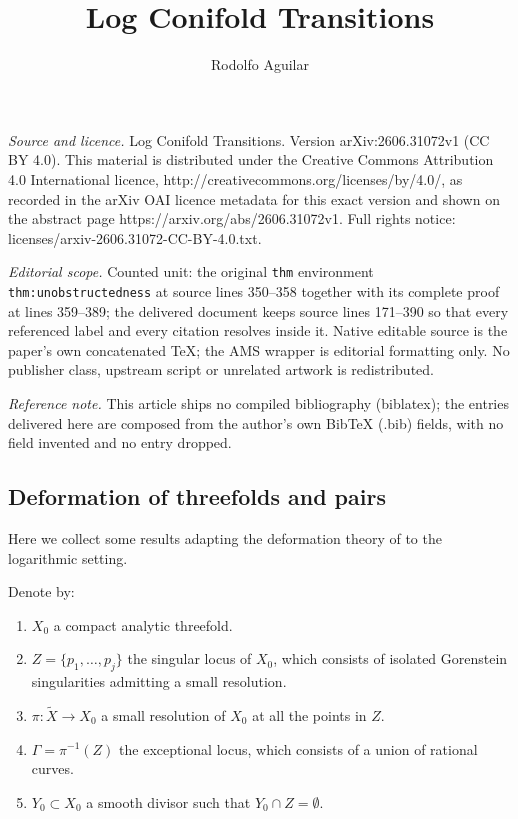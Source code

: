 \documentclass[10pt,a4paper]{amsart}
\begin{document}
\title[Log Conifold Transitions]{Log Conifold Transitions}
\author{Rodolfo Aguilar}
\date{}
\maketitle
\noindent\emph{Source and licence.} Log Conifold Transitions. Version arXiv:2606.31072v1 (CC BY 4.0). This material is distributed under the Creative Commons Attribution 4.0 International licence, http://creativecommons.org/licenses/by/4.0/, as recorded in the arXiv OAI licence metadata for this exact version and shown on the abstract page https://arxiv.org/abs/2606.31072v1. Full rights notice: licenses/arxiv-2606.31072-CC-BY-4.0.txt.\par\smallskip
\noindent\textit{Editorial scope.} Counted unit: the original \texttt{thm} environment \texttt{thm:unobstructedness} at source lines 350--358 together with its complete proof at lines 359--389; the delivered document keeps source lines 171--390 so that every referenced label and every citation resolves inside it. Native editable source is the paper's own concatenated TeX; the AMS wrapper is editorial formatting only. No publisher class, upstream script or unrelated artwork is redistributed.
\par\smallskip\noindent\textit{Reference note.} This article ships no compiled bibliography (biblatex); the entries delivered here are composed from the author's own BibTeX (.bib) fields, with no field invented and no entry dropped.
\subsection{Deformation of threefolds and pairs}\label{ss:DeformationPairs}
Here we collect some results adapting the deformation theory of \cite{F86} to the logarithmic setting. 

Denote by:
\begin{enumerate}
  \item $X_0$ a compact analytic threefold.
  \item $Z=\{p_1,\ldots, p_j\}$ the singular locus of $X_0$, which consists of isolated Gorenstein singularities admitting a small resolution.
  \item $\pi: \tilde{X}\to X_0$ a small resolution of $X_0$ at all the points in $Z$.
  \item $\Gamma=\pi^{-1}(Z)$ the exceptional locus, which consists of a union of rational curves.
  \item $Y_0\subset X_0$ a smooth divisor such that $Y_0 \cap Z = \emptyset$.
\end{enumerate}
\end{document}
